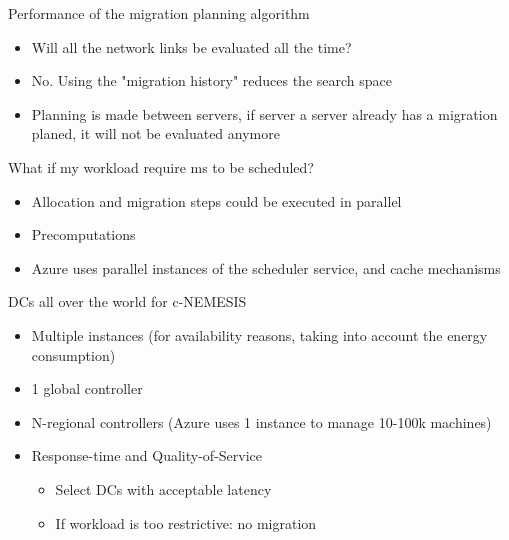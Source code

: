 \documentclass[Ligatures=TeX,table,svgnames,usetotalslideindicator,compress,10pt,aspectratio=169]{beamer}
\begin{document}
\begin{frame}{Performance of the migration planning algorithm}

      \begin{itemize}          
          \item Will all the network links be evaluated all the time?
          \item No. Using the "migration history" reduces the search space
          \item Planning is made between servers, if server a server already has a migration planed, it will not be evaluated anymore
          
      \end{itemize}
\end{frame}


\begin{frame}{What if my workload require ms to be scheduled?}
      \begin{itemize}                    
          \item Allocation and migration steps could be executed in parallel
          \item Precomputations
          \item Azure uses parallel instances of the scheduler service, and cache mechanisms   \end{itemize}
\end{frame}




\begin{frame}{DCs all over the world for c-NEMESIS}
    \begin{itemize}    
        \item Multiple instances (for availability reasons, taking into account the energy consumption)
        \item 1 global controller
        \item N-regional controllers (Azure uses 1 instance to manage 10-100k machines)
        \item Response-time and Quality-of-Service
        \begin{itemize}            
        \item Select DCs with acceptable latency
        \item If workload is too restrictive: no migration
        \end{itemize}        
    \end{itemize}
\end{frame}
\end{document}
